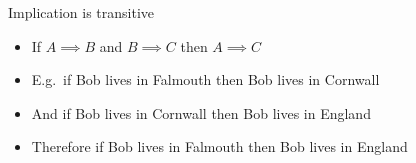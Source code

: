 \begin{frame}{Implication is transitive}
	\begin{itemize}
		\pause\item If $A \implies B$ and $B \implies C$ then $A \implies C$
		\pause\item E.g.\ if Bob lives in Falmouth then Bob lives in Cornwall
		\pause\item And if Bob lives in Cornwall then Bob lives in England
		\pause\item Therefore if Bob lives in Falmouth then Bob lives in England
	\end{itemize}
\end{frame}

